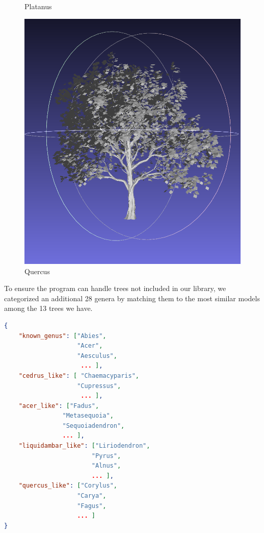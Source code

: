 \documentclass[12pt]{article}
\begin{document}
\begin{figure}[H]
\begin{minipage}{0.24\textwidth}
        \caption{Platanus}
    \end{minipage}\hfill
    \begin{minipage}{0.24\textwidth}
        \centering
        \includegraphics[width=\textwidth]{images/quercus.png}
        \caption{Quercus}
    \end{minipage}
\end{figure}

To ensure the program can handle trees not included in our library, we
categorized an additional 28 genera by matching them to the most similar
models among the 13 trees we have.

\begin{lstlisting}[language=json]
{
    "known_genus": ["Abies",
                    "Acer",
                    "Aesculus",
                     ... ],
    "cedrus_like": [ "Chaemacyparis",
                    "Cupressus",
                     ... ],
    "acer_like": ["Fadus",
                "Metasequoia",
                "Sequoiadendron",
                ... ],
    "liquidambar_like": ["Liriodendron",
                        "Pyrus",
                        "Alnus",
                        ... ],
    "quercus_like": ["Corylus",
                    "Carya",
                    "Fagus",
                    ... ]
}
\end{lstlisting}
\end{document}
